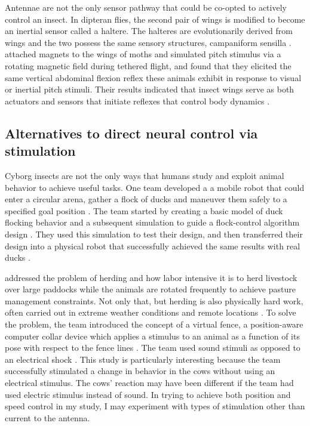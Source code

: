 \documentclass[twocolumn,10pt]{IEEEtran}
\begin{document}
Antennae are not the only sensor pathway that could be co-opted to actively control an insect. In dipteran flies, the second pair of wings is modified to become an inertial sensor called a haltere.  The halteres are evolutionarily derived from wings and the two possess the same sensory structures, campaniform sensilla \cite{Dickerson2014}. \cite{Dickerson2014} attached magnets to the wings of moths and simulated pitch stimulus via a rotating magnetic field during tethered flight, and found that they elicited the same vertical abdominal flexion reflex these animals exhibit in response to visual or inertial pitch stimuli. Their results indicated that insect wings serve as both actuators and sensors that initiate reflexes that control body dynamics \cite{Dickerson2014}.

\subsection{Alternatives to direct neural control via stimulation}
Cyborg insects are not the only ways that humans study and exploit animal behavior to achieve useful tasks. One team developed a a mobile robot that could enter a circular arena, gather a flock of ducks and maneuver them safely to a specified goal position \cite{robot}. The team started by creating a basic model of duck flocking behavior and a subsequent simulation to guide a flock-control algorithm design \cite{robot}. They used this simulation to test their design, and then transferred their design into a physical robot that successfully achieved the same results with real ducks \cite{robot}.

\cite{butler2004virtual} addressed the problem of herding and how labor intensive it is to herd livestock over large paddocks while the animals are rotated frequently to achieve pasture management constraints. Not only that, but herding is also physically hard work, often carried out in extreme weather conditions and remote locations \cite{butler2004virtual}. To solve the problem, the team introduced the concept of a virtual fence, a position-aware computer collar device which applies a stimulus to an animal as a function of its pose with respect to the fence lines \cite{butler2004virtual}. The team used sound stimuli as opposed to an electrical shock \cite{butler2004virtual}. This study is particularly interesting because the team successfully stimulated a change in behavior in the cows without using an electrical stimulus. The cows' reaction may have been different if the team had used electric stimulus instead of sound. In trying to achieve both position and speed control in my study, I may experiment with types of stimulation other than current to the antenna.
\end{document}

